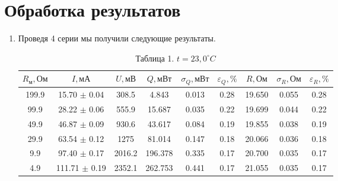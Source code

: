 \documentclass[a4paper]{article}
\begin{document}
\section{Обработка результатов}
\begin{enumerate}
\item Проведя 4 серии мы получили следующие результаты.
\begin{table}[h!]
    \centering
    \begin{tabular}{|*{9}{c|}}
\hline
        $R_\text{м}, \text{Ом}$ & $I, \text{мА}$ & $U, \text{мВ}$ & $Q, \text{мВт}$ & $\sigma_Q, \text{мВт}$ & $\varepsilon_Q, \%$ & $R, \text{Ом}$ & $\sigma_R,  \text{Ом}$ & $\varepsilon_R, \%$ \\ \hline
        199.9  & 15.70 $\pm$ 0.04 & 308.5  & 4.843  & 0.013  & 0.28  & 19.650  & 0.055  & 0.28 \\ \hline
        99.9   & 28.22 $\pm$ 0.06 & 555.9  & 15.687 & 0.035  & 0.22  & 19.699  & 0.044  & 0.22 \\ \hline
        49.9   & 46.87 $\pm$ 0.09 & 930.6  & 43.617 & 0.084  & 0.19  & 19.855  & 0.038  & 0.19 \\ \hline
        29.9   & 63.54 $\pm$ 0.12 & 1275   & 81.014 & 0.147  & 0.18  & 20.066  & 0.036  & 0.18 \\ \hline
        9.9    & 97.40 $\pm$ 0.17 & 2016.2 & 196.378 & 0.335  & 0.17  & 20.700  & 0.035  & 0.17 \\ \hline
        4.9    & 111.71 $\pm$ 0.19 & 2352.1 & 262.753 & 0.441  & 0.17  & 21.055  & 0.035  & 0.17 \\ \hline
    \end{tabular}
    \caption{Таблица 1. $t = 23,0 ^\circ C$}
\end{table}


\end{enumerate}
\end{document}
